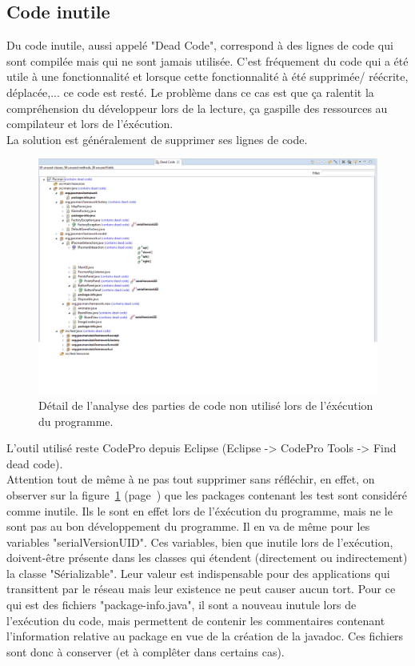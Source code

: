 \documentclass[12pt,a4paper,final]{article}
\newcommand{\labelfigure}[1]{figure~\ref{#1} (page~\pageref{#1})}
\begin{document}
\subsection{Code inutile}\label{deadCode}
Du code inutile, aussi appelé "Dead Code", correspond à des lignes de code qui sont compilée mais qui ne sont jamais utilisée. 
C'est fréquement du code qui a été utile à une fonctionnalité et lorsque cette fonctionnalité à été supprimée/ réécrite, déplacée,... ce code est resté. Le problème dans ce cas est que ça ralentit la compréhension du développeur lors de la lecture, ça gaspille des ressources au compilateur et lors de l'éxécution.\\
La solution est généralement de supprimer ses lignes de code.
\begin{figure}[!h]
	\centering
	\includegraphics[width=\textwidth]{DeadCode.png}
	\caption{\label{deadcode}Détail de l'analyse des parties de code non utilisé lors de l'éxécution du programme.}
\end{figure}
L'outil utilisé reste CodePro depuis Eclipse (Eclipse -> CodePro Tools -> Find dead code).\\
Attention tout de même à ne pas tout supprimer sans réfléchir, en effet, on observer sur la \labelfigure{deadcode} que les packages contenant les test sont considéré comme inutile. Ils le sont en effet lors de l'éxécution du programme, mais ne le sont pas au bon développement du programme. Il en va de même pour les variables "serialVersionUID". Ces variables, bien que inutile lors de l'exécution, doivent-être présente dans les classes qui étendent (directement ou indirectement) la classe "Sérializable". Leur valeur est indispensable pour des applications qui transittent par le réseau mais leur existence ne peut causer aucun tort. Pour ce qui est des fichiers "package-info.java", il sont a nouveau inutule lors de l'exécution du code, mais permettent de contenir les commentaires contenant l'information relative au package en vue de la création de la javadoc. Ces fichiers sont donc à conserver (et à complêter dans certains cas).\\
\end{document}
